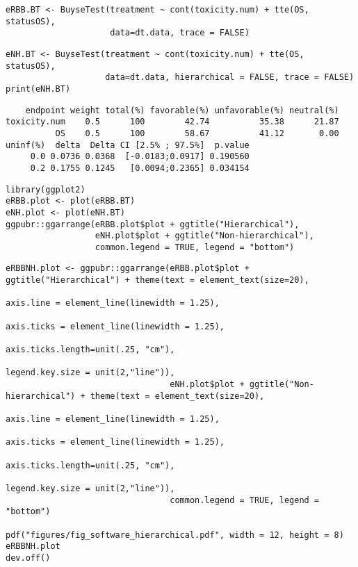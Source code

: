 \documentclass[12pt]{article}
\begin{document}
\lstset{language=r,label= ,caption= ,captionpos=b,numbers=none}
\begin{lstlisting}
eRBB.BT <- BuyseTest(treatment ~ cont(toxicity.num) + tte(OS, statusOS),
                     data=dt.data, trace = FALSE)
\end{lstlisting}

\lstset{language=r,label= ,caption= ,captionpos=b,numbers=none}
\begin{lstlisting}
eNH.BT <- BuyseTest(treatment ~ cont(toxicity.num) + tte(OS, statusOS),
                    data=dt.data, hierarchical = FALSE, trace = FALSE)
print(eNH.BT)
\end{lstlisting}

\begin{verbatim}
    endpoint weight total(%) favorable(%) unfavorable(%) neutral(%)
toxicity.num    0.5      100        42.74          35.38      21.87
          OS    0.5      100        58.67          41.12       0.00
uninf(%)  delta  Delta CI [2.5% ; 97.5%]  p.value
     0.0 0.0736 0.0368  [-0.0183;0.0917] 0.190560
     0.2 0.1755 0.1245   [0.0094;0.2365] 0.034154
\end{verbatim}


\lstset{language=r,label= ,caption= ,captionpos=b,numbers=none}
\begin{lstlisting}
library(ggplot2)
eRBB.plot <- plot(eRBB.BT)
eNH.plot <- plot(eNH.BT)
ggpubr::ggarrange(eRBB.plot$plot + ggtitle("Hierarchical"),
                  eNH.plot$plot + ggtitle("Non-hierarchical"),
                  common.legend = TRUE, legend = "bottom")
\end{lstlisting}

\lstset{language=r,label= ,caption= ,captionpos=b,numbers=none}
\begin{lstlisting}
eRBBNH.plot <- ggpubr::ggarrange(eRBB.plot$plot + ggtitle("Hierarchical") + theme(text = element_text(size=20), 
                                                                                  axis.line = element_line(linewidth = 1.25),
                                                                                  axis.ticks = element_line(linewidth = 1.25),
                                                                                  axis.ticks.length=unit(.25, "cm"),
                                                                                  legend.key.size = unit(2,"line")),
                                 eNH.plot$plot + ggtitle("Non-hierarchical") + theme(text = element_text(size=20), 
                                                                                     axis.line = element_line(linewidth = 1.25),
                                                                                     axis.ticks = element_line(linewidth = 1.25),
                                                                                     axis.ticks.length=unit(.25, "cm"),
                                                                                     legend.key.size = unit(2,"line")),
                                 common.legend = TRUE, legend = "bottom")

pdf("figures/fig_software_hierarchical.pdf", width = 12, height = 8)
eRBBNH.plot
dev.off()
\end{lstlisting}
\end{document}
